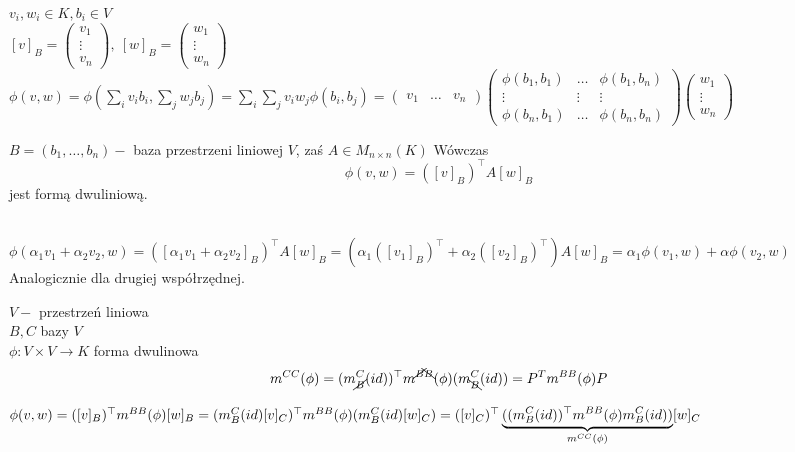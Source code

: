 \begin{dd} $v_i,w_i \in K, b_i \in V$ \\ 
    $[v]_B = \begin{pmatrix} v_1 \\ \vdots \\ v_n \end{pmatrix},\ 
     [w]_B = \begin{pmatrix} w_1 \\ \vdots \\ w_n \end{pmatrix}$ \\ 
    $\phi(v,w) = \phi( \sum\limits_i v_i b_i, \sum\limits_j w_j b_j) = 
    \sum\limits_i \sum\limits_j v_i w_j \phi (b_i,b_j) = 
    \begin{pmatrix} v_1 &\dots& v_n \end{pmatrix}
    \begin{pmatrix} \phi(b_1,b_1) & \dots & \phi(b_1,b_n) \\ 
                    \vdots & \vdots & \vdots \\ 
                \phi(b_n,b_1) & \dots & \phi(b_n,b_n) \end{pmatrix}
    \begin{pmatrix} w_1 \\ \vdots \\ w_n \end{pmatrix}$
\end{dd}
\begin{ft} 
    $B = (b_1,\ldots,b_n) - $ baza przestrzeni liniowej $V$, zaś $A \in M_{n \times n}(K)$
    Wówczas \[ \phi(v,w) = ([v]_B)^\top A [w]_B\] jest formą dwuliniową.
\end{ft} 
\begin{dd} ~\\ 
    $\phi(\alpha_1 v_1 + \alpha_2 v_2,w) = ([\alpha_1 v_1+\alpha_2 v_2]_B)^\top 
    A[w]_B = (\alpha_1([v_1]_B)^\top + \alpha_2([v_2]_B)^\top)A [w]_B = 
    \alpha_1 \phi(v_1,w) + \alpha \phi(v_2,w)$ Analogicznie dla drugiej współrzędnej. 
\end{dd} 
\begin{ft} 
    $V - $ przestrzeń liniowa \\ 
    $B, C $ bazy $V$ \\ 
    $\phi: V \times V \to K$ forma dwulinowa 
    \[ m^{CC} (\phi) = (m_{\cancel{B}}^C(id))^\top m^{\cancel{B}\bcancel{B}}
    (\phi) (m_{\bcancel{B}}^C(id)) = P^T m^{BB}(\phi) P\]
\end{ft} 
\begin{dd} 
    $\phi (v,w) = ([v]_B)^\top m^{BB}(\phi) [w]_B = (m_B^C(id)[v]_C)^\top m^{BB}(\phi) 
    (m_B^C(id)[w]_C) = \\ ([v]_C)^\top 
    \underbrace{((m_B^C (id))^\top m^{BB}(\phi) m_B^C(id))}_{m^{CC}(\phi)} [w]_C$
\end{dd} 
